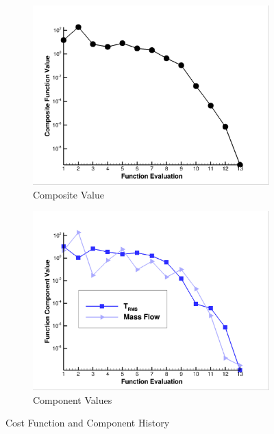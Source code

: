 \begin{figure}[h]
  \centering
	\begin{subfigure}[b]{0.45\textwidth}
    \centering
    \includegraphics[width=\textwidth]{figures/1st-H2/cost_func.png}
    \caption{Composite Value}
    \label{fig:cost-func-1st-H2}
  \end{subfigure}
	\begin{subfigure}[b]{0.45\textwidth}
    \centering
    \includegraphics[width=\textwidth]{figures/1st-H2/func_components.png}
    \caption{Component Values}
    \label{fig:components-1st-H2}
  \end{subfigure}
  \caption{Cost Function and Component History}
\end{figure}
